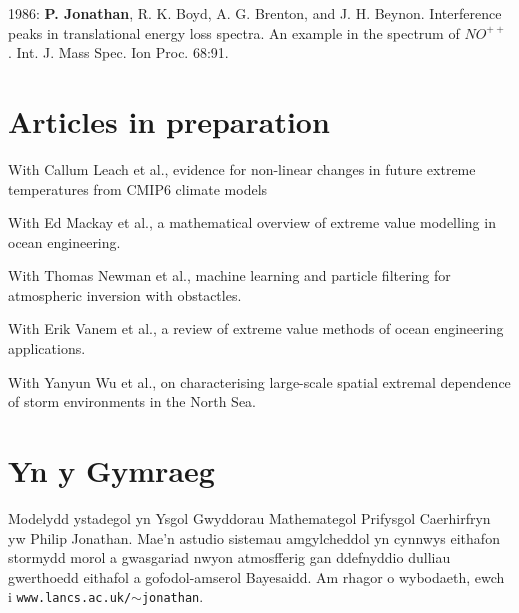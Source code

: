 \documentclass[11pt,a4paper]{moderncv}
\begin{document}
1986: \textbf{P. Jonathan}, R. K. Boyd, A. G. Brenton, and J. H. Beynon. Interference peaks in translational energy loss spectra. An example in the spectrum of $NO^{++}$ . Int. J. Mass Spec. Ion Proc. 68:91.

\setlength{\parskip}{0em}

\section{Articles in preparation}

\setlength{\parskip}{0.5em}

With Callum Leach et al., evidence for non-linear changes in future extreme temperatures from CMIP6 climate models

With Ed Mackay et al., a mathematical overview of extreme value modelling in ocean engineering.

With Thomas Newman et al., machine learning and particle filtering for atmospheric inversion with obstactles.

With Erik Vanem et al., a review of extreme value methods of ocean engineering applications.

With Yanyun Wu et al., on characterising large-scale spatial extremal dependence of storm environments in the North Sea.

\setlength{\parskip}{0em}

\section{Yn y Gymraeg}
Modelydd ystadegol yn Ysgol Gwyddorau Mathemategol Prifysgol Caerhirfryn yw Philip Jonathan. Mae'n astudio sistemau amgylcheddol yn cynnwys eithafon stormydd morol a gwasgariad nwyon atmosfferig gan ddefnyddio dulliau gwerthoedd eithafol a gofodol-amserol Bayesaidd. Am rhagor o wybodaeth, ewch i \texttt{www.lancs.ac.uk/$\sim$jonathan}.

\clearpage
\end{document}
